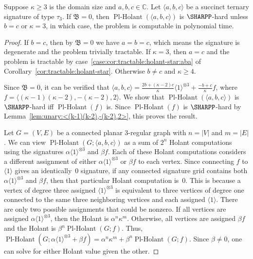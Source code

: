 \documentclass[11pt]{article}
\newcommand{\PlHolant}{\operatorname{Pl-Holant}}
\begin{document}
\begin{corollary} \label{cor:unary:dichotomy:a+(k-3)b-(k-2)c=0}
 Suppose $\kappa \ge 3$ is the domain size and $a,b,c \in \mathbb{C}$.
 Let $\langle a,b,c \rangle$ be a succinct ternary signature of type $\tau_3$.
 If $\mathfrak{B} = 0$,
 then $\PlHolant(\langle a,b,c \rangle)$ is $\SHARPP$-hard unless $b = c$ or $\kappa = 3$,
 in which case, the problem is computable in polynomial time.
\end{corollary}

\begin{proof}
 If $b = c$,
 then by $\mathfrak{B} = 0$ we have $a = b = c$,
 which means the signature is degenerate and the problem trivially tractable.
 If $\kappa = 3$,
 then $a = c$ and the problem is tractable by case~\ref{case:cor:tractable:holant-star:aba} of Corollary~\ref{cor:tractable:holant-star}.
 Otherwise $b \ne c$ and $\kappa \ge 4$.

 Since $\mathfrak{B} = 0$,
 it can be verified that $\langle a,b,c \rangle = \frac{2 b + (\kappa - 2) c}{\kappa} \langle 1 \rangle^{\otimes 3} + \frac{-b + c}{\kappa} f$,
 where $f = \langle (\kappa - 1) (\kappa - 2), -(\kappa - 2), 2 \rangle$.
 We show that $\PlHolant(\langle a,b,c \rangle)$ is $\SHARPP$-hard iff $\PlHolant(f)$ is.
 Since $\PlHolant(f)$ is $\SHARPP$-hard by Lemma~\ref{lem:unary:<(k-1)(k-2),-(k-2),2>},
 this proves the result.
 
 Let $G = (V,E)$ be a connected planar 3-regular graph with $n = |V|$ and $m = |E|$.
 We can view $\PlHolant(G; \langle a,b,c \rangle)$ as a sum of $2^n$ Holant computations using the signatures $\alpha \langle 1 \rangle^{\otimes 3}$ and $\beta f$.
 Each of these Holant computations considers a different assignment of either $\alpha \langle 1 \rangle^{\otimes 3}$ or $\beta f$ to each vertex.
 Since connecting $f$ to $\langle 1 \rangle$ gives an identically~$0$ signature,
 if any connected signature grid contains both $\alpha \langle 1 \rangle^{\otimes 3}$ and $\beta f$,
 then that particular Holant computation is~$0$.
 This is because a vertex of degree three assigned $\langle 1 \rangle^{\otimes 3}$ is equivalent to three vertices of degree one
 connected to the same three neighboring vertices and each assigned $\langle 1 \rangle$.
 There are only two possible assignments that could be nonzero.
 If all vertices are assigned $\alpha \langle 1 \rangle^{\otimes 3}$,
 then the Holant is $\alpha^n \kappa^m$.
 Otherwise, all vertices are assigned $\beta f$ and the Holant is $\beta^n \PlHolant(G; f)$.
 Thus, $\PlHolant(G; \alpha \langle 1 \rangle^{\otimes 3} + \beta f) = \alpha^n \kappa^m + \beta^n \PlHolant(G; f)$.
 Since $\beta \ne 0$,
 one can solve for either Holant value given the other.
\end{proof}
\end{document}
